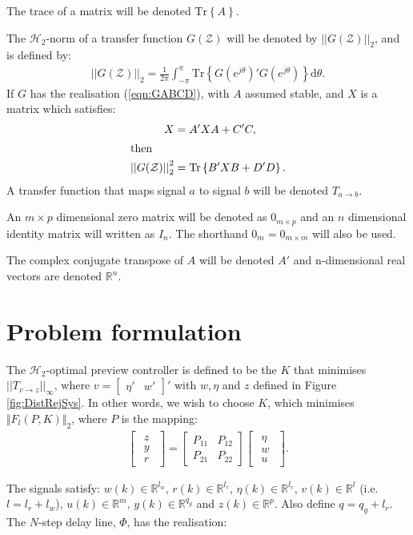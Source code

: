 \documentclass[a4paper,12pt]{article}
\theoremstyle{remark}
\newcommand{\arr}[2]{
        \begin{array}{#1}
        #2
        \end{array}}
\newcommand{\nrm}[1]{\left|\left| #1 \right|\right|}
\newcommand{\ma}[1]{\begin{bmatrix} #1 \end{bmatrix}}
\newcommand{\als}[1]{\begin{align*} #1 \end{align*}}
\newcommand{\aln}[1]{\begin{align} #1 \end{align}}
\newcommand{\tra}[1]{\textrm{Tr}\left\{ #1 \right\}}
\newcommand{\szo}[2]{#1\in \mathbb{R}^{#2}}
\newcommand{\htwo}{\mathcal H_2}
\newcommand{\z}{\cal{Z}}
\renewcommand{\z}{\mathcal{Z}}
\begin{document}
The trace of a matrix will be denoted $\tra{A}$.
 
The $\htwo$-norm of a transfer function $G(\mathcal{Z})$ will be denoted by $\nrm{G(\z)}_2$, and is defined by:
\als{\nrm{G(\z)}_2=\frac{1}{2\pi}\int_{-\pi}^{\pi}\tra{G(e^{j\theta})'G(e^{j\theta})}\textrm{d}\theta.}
If $G$ has the realisation (\ref{eqn:GABCD}), with $A$ assumed stable, and $X$ is a matrix which satisfies:
\aln{
X&=A'XA+C'C, \nonumber\\
\intertext{then}
\nrm{G(\z)}^2_2&=\tra{B'XB+D'D}\label{eqn:2normcomp}
.}
%
A transfer function that maps signal $a$ to signal $b$ will be denoted $T_{a\rightarrow b}$.

An $m\times p$ dimensional zero matrix will be denoted as $0_{m\times p}$ and an $n$ dimensional identity matrix will written as $I_n$. The shorthand $0_m=0_{m\times m}$ will also be used. %

The complex conjugate transpose of $A$ will be denoted $A'$ and n-dimensional real vectors are denoted $\mathbb{R}^n$.



 
\section{Problem formulation}
\label{sec:Sys}
The $\htwo$-optimal preview controller is defined to be the $K$ that minimises $\nrm{T_{v\rightarrow z}}_\infty$, where $v=\ma{\eta'&w'}'$ with $w,\eta$ and $z$ defined in Figure \ref{fig:DistRejSys}. In other words, we wish to choose $K$, which minimises $\Vert F_l(P,K) \Vert_2$, where $P$ is the mapping:
\als{
\ma{\arr{c}{z\\\hline y\\r}}=\ma{P_{11} & P_{12}\\P_{21} & P_{22}}\ma{\arr{c}{ \eta\\w \\\hline u}}
.}

The signals satisfy: $\szo{w(k)}{l_w}$, $\szo{r(k)}{l_r}$, $\szo{\eta(k)}{l_r}$, $\szo{v(k)}{l}$ (i.e. $l=l_r+l_w$), $\szo{u(k)}{m}$, $\szo{y(k)}{q_g}$   and $\szo{z(k)}{p}$.  Also define $q=q_g+l_r$. The  $N$-step delay line, $\Phi$, has the realisation:
\end{document}
